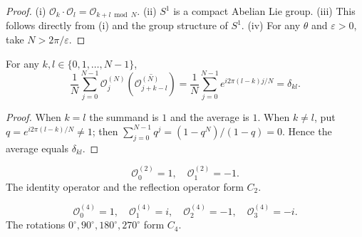 \begin{proof}
(i) $\mathcal{O}_k \cdot \mathcal{O}_l = \mathcal{O}_{k+l \bmod N}$. (ii) $S^1$ is a compact Abelian Lie group. (iii) This follows directly from (i) and the group structure of $S^1$. (iv) For any $\theta$ and $\varepsilon > 0$, take $N > 2\pi/\varepsilon$.
\end{proof}

\begin{proposition}\label{prop:phase_operator_orthogonality}
For any $k, l \in \{0, 1, \dots, N-1\}$,
\[
\frac{1}{N}\sum_{j=0}^{N-1} \mathcal{O}_j^{(N)}(\overline{\mathcal{O}_{j+k-l}^{(N)}})
= \frac{1}{N}\sum_{j=0}^{N-1} e^{i 2\pi (l-k) j / N}
= \delta_{kl}.
\]
\end{proposition}

\begin{proof}
When $k=l$ the summand is $1$ and the average is $1$. When $k\neq l$, put $q=e^{i2\pi(l-k)/N}\neq 1$; then $\sum_{j=0}^{N-1}q^j=(1-q^N)/(1-q)=0$. Hence the average equals $\delta_{kl}$.
\end{proof}

\begin{example}\label{ex:phase_operators_c2}
\[
\mathcal{O}_0^{(2)} = 1, \quad \mathcal{O}_1^{(2)} = -1.
\]
The identity operator and the reflection operator form $C_2$.
\end{example}

\begin{example}\label{ex:phase_operators_c4}
\[
\mathcal{O}_0^{(4)} = 1, \quad \mathcal{O}_1^{(4)} = i, \quad \mathcal{O}_2^{(4)} = -1, \quad \mathcal{O}_3^{(4)} = -i.
\]
The rotations $0^\circ, 90^\circ, 180^\circ, 270^\circ$ form $C_4$.
\end{example}

